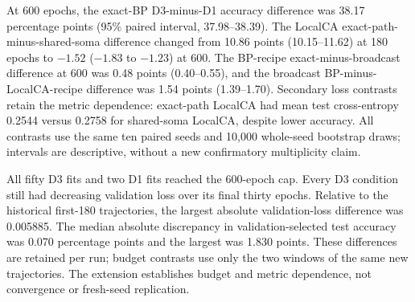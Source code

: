 At 600 epochs, the exact-BP D3-minus-D1 accuracy difference was 38.17 percentage points (95\% paired interval, 37.98--38.39). The LocalCA exact-path-minus-shared-soma difference changed from 10.86 points (10.15--11.62) at 180 epochs to $-1.52$ ($-1.83$ to $-1.23$) at 600. The BP-recipe exact-minus-broadcast difference at 600 was 0.48 points (0.40--0.55), and the broadcast BP-minus-LocalCA-recipe difference was 1.54 points (1.39--1.70). Secondary loss contrasts retain the metric dependence: exact-path LocalCA had mean test cross-entropy 0.2544 versus 0.2758 for shared-soma LocalCA, despite lower accuracy. All contrasts use the same ten paired seeds and 10,000 whole-seed bootstrap draws; intervals are descriptive, without a new confirmatory multiplicity claim.

All fifty D3 fits and two D1 fits reached the 600-epoch cap. Every D3 condition still had decreasing validation loss over its final thirty epochs. Relative to the historical first-180 trajectories, the largest absolute validation-loss difference was 0.005885. The median absolute discrepancy in validation-selected test accuracy was 0.070 percentage points and the largest was 1.830 points. These differences are retained per run; budget contrasts use only the two windows of the same new trajectories. The extension establishes budget and metric dependence, not convergence or fresh-seed replication.
